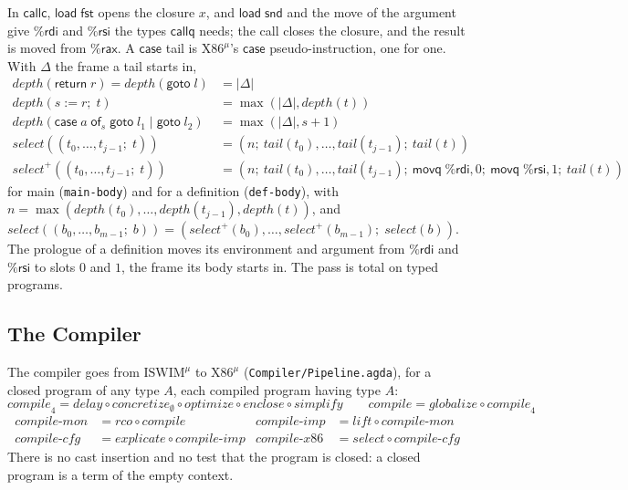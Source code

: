 \documentclass[10pt]{article}
\theoremstyle{acmplain}
\newcommand{\key}[1]{\mathsf{#1}}
\newcommand{\pass}[1]{\mathit{#1}}
\newcommand{\assign}[3]{#1 \mathrel{:=} #2;\; #3}
\newcommand{\rax}{\%\key{rax}}
\newcommand{\rdi}{\%\key{rdi}}
\newcommand{\rsi}{\%\key{rsi}}
\newcommand{\Treturn}[1]{\key{return}\;#1}
\newcommand{\Tgoto}[1]{\key{goto}\;#1}
\newcommand{\Tcase}[4]{\key{case}\;#1\;\key{of}_{#2}\;\key{goto}\;#3 \mid \key{goto}\;#4}
\newcommand{\Ml}[1]{\textrm{#1}^{\mu}}                  %
\begin{document}
In $\key{callc}$, $\key{load}\;\key{fst}$ opens the closure $x$, and
$\key{load}\;\key{snd}$ and the move of the argument give $\rdi$ and $\rsi$
the types $\key{callq}$ needs; the call closes the closure, and the result
is moved from $\rax$. A $\key{case}$ tail is $\Ml{X86}$'s $\key{case}$
pseudo-instruction, one for one. With $\Delta$ the frame a tail starts in,
\begin{align*}
  \mathit{depth}(\Treturn{r}) = \mathit{depth}(\Tgoto{l}) &= |\Delta| \\
  \mathit{depth}(\assign{s}{r}{t}) &= \max(|\Delta|, \mathit{depth}(t)) \\
  \mathit{depth}(\Tcase{a}{s}{l_1}{l_2}) &= \max(|\Delta|, s + 1) \\[1ex]
  \pass{select}((t_0, \ldots, t_{j-1};\; t)) &=
    (n;\ \pass{tail}(t_0), \ldots, \pass{tail}(t_{j-1});\ \pass{tail}(t)) \\
  \pass{select}^{+}((t_0, \ldots, t_{j-1};\; t)) &=
    (n;\ \pass{tail}(t_0), \ldots, \pass{tail}(t_{j-1});\
     \key{movq}\; \rdi, 0;\ \key{movq}\; \rsi, 1;\ \pass{tail}(t))
\end{align*}
for main (\texttt{main-body}) and for a definition (\texttt{def-body}),
with $n = \max(\mathit{depth}(t_0), \ldots, \mathit{depth}(t_{j-1}),
\mathit{depth}(t))$, and $\pass{select}((b_0, \ldots, b_{m-1};\; b)) =
(\pass{select}^{+}(b_0), \ldots, \pass{select}^{+}(b_{m-1});\;
\pass{select}(b))$. The prologue of a definition moves its environment and
argument from $\rdi$ and $\rsi$ to slots $0$ and $1$, the frame its body
starts in. The pass is total on typed programs.

\subsection{The Compiler}

The compiler goes from $\Ml{ISWIM}$ to $\Ml{X86}$
(\texttt{Compiler/Pipeline.agda}), for a closed program of any type $A$,
each compiled program having type $A$:
\[
  \pass{compile}_4 = \pass{delay} \circ \pass{concretize}_{\emptyset}
     \circ \pass{optimize} \circ \pass{enclose} \circ \pass{simplify}
  \qquad
  \pass{compile} = \pass{globalize} \circ \pass{compile}_4
\]
\begin{align*}
  \pass{compile\text{-}mon} &= \pass{rco} \circ \pass{compile}
  &
  \pass{compile\text{-}imp} &= \pass{lift} \circ \pass{compile\text{-}mon} \\
  \pass{compile\text{-}cfg} &= \pass{explicate} \circ \pass{compile\text{-}imp}
  &
  \pass{compile\text{-}x86} &= \pass{select} \circ \pass{compile\text{-}cfg}
\end{align*}
There is no cast insertion and no test that the program is closed: a
closed program is a term of the empty context.
\end{document}
